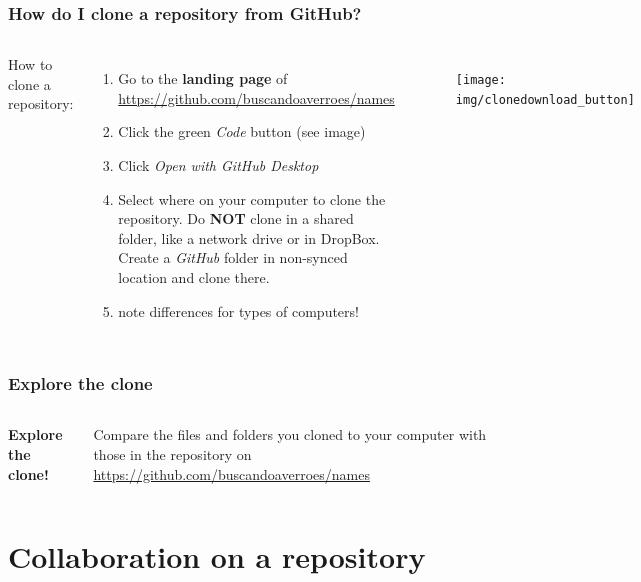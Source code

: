 \documentclass[aspectratio=169]{beamer} %
\newcommand{\trainingURL}[1]{{\color{blue}\url{#1}}}
\newcommand{\traininerUsername}{buscandoaverroes}
\newcommand{\repoName}{\traininerUsername/names}
\newcommand{\trainingRepoURL}[1]{\trainingURL{https://github.com/\repoName #1}}
\begin{document}
\begin{frame}
\frametitle{How do I clone a repository from GitHub?}

	\begin{columns}[c]

		How to clone a repository:
		\begin{enumerate}
			\item Go to the \textbf{landing page} of \trainingRepoURL{}
			\item Click the green \textit{Code} button (see image)
			\item Click \textit{Open with GitHub Desktop}
			\item Select where on your computer to clone the repository. Do \textbf{NOT} clone in a shared folder, like a network drive or in DropBox. Create a \textit{GitHub} folder in non-synced location and clone there.
			\item note differences for types of computers!
		\end{enumerate}

		\begin{figure}
			\centering
			\texttt{[image: img/clonedownload\_button]}
			\label{fig:clonedownloadbutton}
		\end{figure}

	\end{columns}

\end{frame}


\begin{frame}
\frametitle{Explore the clone}

	\begin{columns}[c]


		\textbf{Explore the clone!}

		\vspace{.5cm}

		Compare the files and folders you cloned to your computer with those in the repository on \trainingRepoURL{}


	\end{columns}

\end{frame}

\section{Collaboration on a repository}
\end{document}
